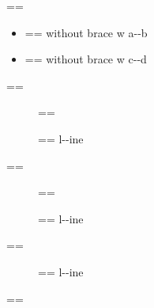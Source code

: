 \documentclass{book}
\makeatletter
\newenvironment{Texinfopreformatted}{%
  \par\GNUTobeylines\obeyspaces\frenchspacing\parskip=\z@\parindent=\z@}{}
{\catcode`\^^M=13 \gdef\GNUTobeylines{\catcode`\^^M=13 \def^^M{\null\par}}}
\newenvironment{Texinfoindented}{\begin{list}{}{}\item\relax}{\end{list}}
\renewcommand{\_}{\Texinfounderscore\discretionary{}{}{}}
\makeatother
\begin{document}
\begin{Texinfoindented}
\begin{itemize}[label=\textbullet{} a--n itemize line]
\end{itemize}
\begin{Texinfopreformatted}%
\ttfamily 
\end{Texinfopreformatted}
\begin{itemize}[label={}]
\item \begin{Texinfopreformatted}%
\ttfamily without brace w a{-}{-}b
\end{Texinfopreformatted}
\item \begin{Texinfopreformatted}%
\ttfamily without brace w c{-}{-}d
\end{Texinfopreformatted}
\end{itemize}
\begin{Texinfopreformatted}%
\ttfamily 
\end{Texinfopreformatted}
\begin{description}
\item[] \begin{Texinfopreformatted}%
\ttfamily \end{Texinfopreformatted}
\item[{\parbox[b]{\linewidth}{%
a}}]
\begin{Texinfopreformatted}%
\ttfamily l{-}{-}ine
\end{Texinfopreformatted}
\end{description}
\begin{Texinfopreformatted}%
\ttfamily 
\end{Texinfopreformatted}
\begin{description}
\item[] \begin{Texinfopreformatted}%
\ttfamily \end{Texinfopreformatted}
\item[{\parbox[b]{\linewidth}{%
a--missing style formatting}}]
\begin{Texinfopreformatted}%
\ttfamily l{-}{-}ine
\end{Texinfopreformatted}
\end{description}
\begin{Texinfopreformatted}%
\ttfamily 
\end{Texinfopreformatted}
\begin{description}
\item[{\parbox[b]{\linewidth}{%
a\\
\index[fn]{a@\texttt{a}}%
\index[cp]{index entry between item and itemx@index entry between item and itemx}%
b
\index[fn]{b@\texttt{b}}%
}}]
\begin{Texinfopreformatted}%
\ttfamily l{-}{-}ine
\end{Texinfopreformatted}
\end{description}
\begin{Texinfopreformatted}%
\ttfamily 
\end{Texinfopreformatted}


\end{Texinfoindented}
\end{document}
